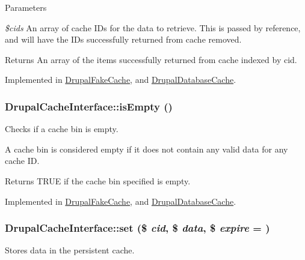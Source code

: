 \begin{DoxyParams}{Parameters}
\item[{\em \$cids}]An array of cache IDs for the data to retrieve. This is passed by reference, and will have the IDs successfully returned from cache removed.\end{DoxyParams}
\begin{DoxyReturn}{Returns}
An array of the items successfully returned from cache indexed by cid. 
\end{DoxyReturn}


Implemented in \hyperlink{classDrupalFakeCache_a9ca8ecb251e83f3d30beb2f6722ef746}{DrupalFakeCache}, and \hyperlink{classDrupalDatabaseCache_ad9f421906b15c039f1842cf8c14e8768}{DrupalDatabaseCache}.\hypertarget{interfaceDrupalCacheInterface_a54fa3e2f8e11cbb551d5168c9f22c720}{
\subsubsection[{isEmpty}]{\setlength{\rightskip}{0pt plus 5cm}DrupalCacheInterface::isEmpty ()}}
\label{interfaceDrupalCacheInterface_a54fa3e2f8e11cbb551d5168c9f22c720}
Checks if a cache bin is empty.

A cache bin is considered empty if it does not contain any valid data for any cache ID.

\begin{DoxyReturn}{Returns}
TRUE if the cache bin specified is empty. 
\end{DoxyReturn}


Implemented in \hyperlink{classDrupalFakeCache_a78bf2c373a0204a24bd809c0f27e7a4e}{DrupalFakeCache}, and \hyperlink{classDrupalDatabaseCache_addc129b38e3ffdda5a55f2f453ea5619}{DrupalDatabaseCache}.\hypertarget{interfaceDrupalCacheInterface_ab9bbd1913d6747a74585f36b9282594c}{
\subsubsection[{set}]{\setlength{\rightskip}{0pt plus 5cm}DrupalCacheInterface::set (\$ {\em cid}, \/  \$ {\em data}, \/  \$ {\em expire} = {})}}
\label{interfaceDrupalCacheInterface_ab9bbd1913d6747a74585f36b9282594c}
Stores data in the persistent cache.



